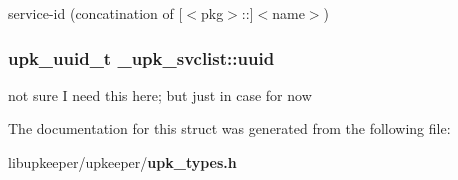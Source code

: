 service-id (concatination of [$<$pkg$>$::]$<$name$>$) 

\subsubsection{\setlength{\rightskip}{0pt plus 5cm}\bf{upk\_\-uuid\_\-t} \bf{\_\-upk\_\-svclist::uuid}}\label{struct__upk__svclist_345fb401183a6de1c3e980d2ee3c018a}


not sure I need this here; but just in case for now 

The documentation for this struct was generated from the following file:\begin{CompactItemize}
\item 
libupkeeper/upkeeper/\bf{upk\_\-types.h}\end{CompactItemize}
